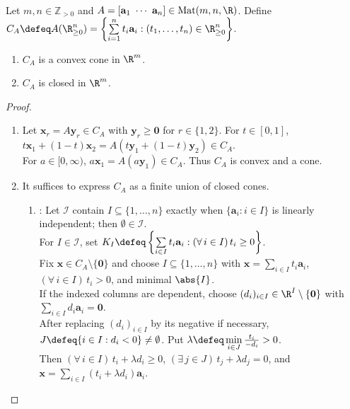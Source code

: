 \begin{lemma} \label{lem:finitely-generated-nonnegative-cone-closed-convex} \\
Let $m,n\in\mathbb{Z}_{>0}$ and $A=[\mathbf{a}_1\ \cdots\ \mathbf{a}_n]\in\operatorname{Mat}(m,n,\R)$. Define $C_A\defeq A(\R_{\geq0}^n)=\left\{\sum\limits_{i=1}^{n}t_i\mathbf{a}_i:(t_1,\ldots,t_n)\in\R_{\geq0}^n\right\}$.
\begin{enumerate}[label=(\roman*)]
\setlength{\itemsep}{0pt}
\item $C_A$ is a convex cone in $\R^m$.
\item $C_A$ is closed in $\R^m$.
\end{enumerate}
\begin{proof}
\begin{enumerate}[label=(\roman*)]
\setlength{\itemsep}{0pt}
\item Let $\mathbf{x}_r=A\mathbf{y}_r\in C_A$ with $\mathbf{y}_r\geq\mathbf{0}$ for $r\in\{1,2\}$. For $t\in[0,1]$, $t\mathbf{x}_1+(1-t)\mathbf{x}_2=A(t\mathbf{y}_1+(1-t)\mathbf{y}_2)\in C_A$.\\
For $a\in[0,\infty)$, $a\mathbf{x}_1=A(a\mathbf{y}_1)\in C_A$. Thus $C_A$ is convex and a cone.
\item It suffices to express $C_A$ as a finite union of closed cones.
\begin{enumerate}[label=(\alph*)]
\setlength{\itemsep}{0pt}
\item {}: Let $\mathcal{I}$ contain $I\subseteq\{1,\ldots,n\}$ exactly when $\{\mathbf{a}_i:i\in I\}$ is linearly independent; then $\emptyset\in\mathcal{I}$.\\
For $I\in\mathcal{I}$, set $K_I\defeq\left\{\sum\limits_{i\in I}t_i\mathbf{a}_i:(\forall\,i\in I)\,t_i\geq0\right\}$.\\
Fix $\mathbf{x}\in C_A\setminus\{\mathbf{0}\}$ and choose $I\subseteq\{1,\ldots,n\}$ with $\mathbf{x}=\sum\limits_{i\in I}t_i\mathbf{a}_i$, $(\forall\,i\in I)\,t_i>0$, and minimal $\abs{I}$.\\
If the indexed columns are dependent, choose $(d_i)_{i\in I}\in\R^I\setminus\{\mathbf{0}\}$ with $\sum\limits_{i\in I}d_i\mathbf{a}_i=\mathbf{0}$.\\
After replacing $(d_i)_{i\in I}$ by its negative if necessary, $J\defeq\{i\in I:d_i<0\}\neq\emptyset$. Put $\lambda\defeq\min\limits_{i\in J}\frac{t_i}{-d_i}>0$.\\
Then $(\forall\,i\in I)\,t_i+\lambda d_i\geq0$, $(\exists\,j\in J)\,t_j+\lambda d_j=0$, and $\mathbf{x}=\sum\limits_{i\in I}(t_i+\lambda d_i)\mathbf{a}_i$.\\

\end{enumerate}
\end{enumerate}
\end{proof}
\end{lemma}
